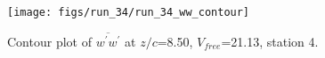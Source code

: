 \begin{figure}[H]
\centering
\texttt{[image: figs/run\_34/run\_34\_ww\_contour]}
\caption{Contour plot of $\overline{w^\prime w^\prime}$ at $z/c$=8.50, $V_{free}$=21.13, station 4.}
\label{fig:run_34_ww_contour}
\end{figure}


